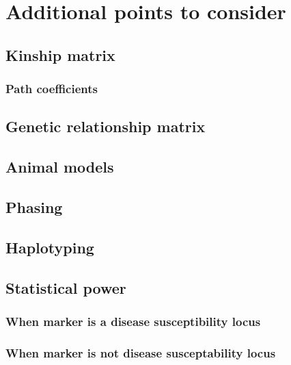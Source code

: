 \documentclass[]{book}
\theoremstyle{definition}
\theoremstyle{definition}
\theoremstyle{definition}
\theoremstyle{remark}
\begin{document}
\chapter{Additional points to
consider}\label{additional-points-to-consider}

\section{Kinship matrix}\label{kinship-matrix}

\subsection{Path coefficients}\label{path-coefficients}

\section{Genetic relationship matrix}\label{genetic-relationship-matrix}

\section{Animal models}\label{animal-models}

\section{Phasing}\label{phasing}

\section{Haplotyping}\label{haplotyping}

\section{Statistical power}\label{statistical-power}

\subsection{When marker is a disease susceptibility
locus}\label{when-marker-is-a-disease-susceptibility-locus}

\subsection{When marker is not disease susceptability
locus}\label{when-marker-is-not-disease-susceptability-locus}
\end{document}

